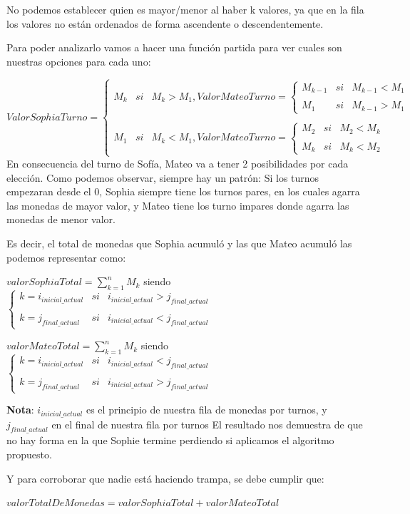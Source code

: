 No podemos establecer quien es mayor/menor al haber k valores, ya que en la fila los valores no están ordenados de forma ascendente o descendentemente.

Para poder analizarlo vamos a hacer una función partida para ver cuales son nuestras opciones para cada uno:

$ValorSophiaTurno= \left\{ \begin{array}{lcc} M_{k} & si & M_{k}>M_{1} , ValorMateoTurno= \left\{ \begin{array}{lcc} M_{k-1} & si & M_{k-1}<M_{1} \\ \\ M_{1} & si & M_{k-1} > M_{1} \end{array} \right. \\ \\ M_{1} & si & M_{k} < M_{1}, ValorMateoTurno= \left\{ \begin{array}{lcc} M_{2} & si & M_{2}<M_{k} \\ \\ M_{k} & si & M_{k} < M_{2} \end{array} \right. \end{array} \right.$
\vskip0.3cm
En consecuencia del turno de Sofía, Mateo va a tener 2 posibilidades por cada elección.
\vskip0.7cm
Como podemos observar, siempre hay un patrón: Si los turnos empezaran desde el 0, Sophia siempre tiene los turnos pares, en los cuales agarra las monedas de mayor valor, y Mateo tiene los turno impares donde agarra las monedas de menor valor.

\vskip0.5cm

Es decir, el total de monedas que Sophia acumuló y las que Mateo acumuló las podemos representar como:

\vskip0.5cm
$valorSophiaTotal =  \sum_{k=1}^{n}M_{k}$ siendo $\left\{ \begin{array}{lcc} k=i_{inicial\_actual} & si & i_{inicial\_actual}>j_{final\_actual} \\ \\ k=j_{final\_actual} & si & i_{inicial\_actual}<j_{final\_actual} \end{array} \right.$

\vskip0.5cm
$valorMateoTotal =  \sum_{k=1}^{n}M_{k}$ siendo $\left\{ \begin{array}{lcc} k=i_{inicial\_actual} & si & i_{inicial\_actual}<j_{final\_actual} \\ \\ k=j_{final\_actual} & si & i_{inicial\_actual}>j_{final\_actual} \end{array} \right.$

\vskip0.5cm
\textbf{Nota}: $i_{inicial\_actual}$ es el principio de nuestra fila de monedas por turnos, y $j_{final\_actual}$ en el final de nuestra fila por turnos 
\vskip0.8cm
El resultado nos demuestra de que no hay forma en la que Sophie termine perdiendo si aplicamos el algoritmo propuesto.
\vskip0.5cm

Y para corroborar que nadie está haciendo trampa, se debe cumplir que:
\vskip0.5cm
\begin{center}
    $valorTotalDeMonedas=valorSophiaTotal+valorMateoTotal$
\end{center}


